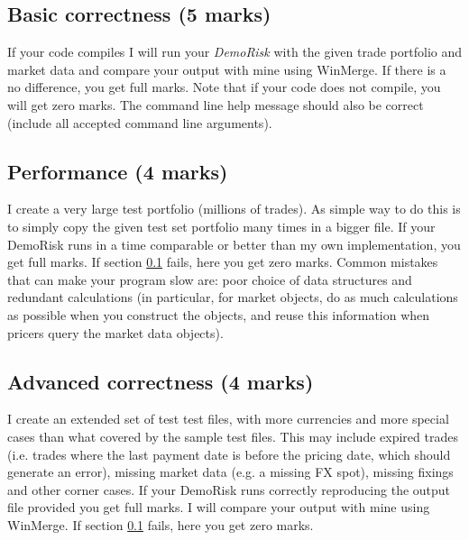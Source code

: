 \documentclass[10pt]{article}
\begin{document}
\subsection{Basic correctness (5 marks)}
\label{sec:correct}
If your code compiles I will run your \textit{DemoRisk} with the given trade portfolio and market data and compare your output with mine using WinMerge. If there is a no difference, you get full marks. Note that if your code does not compile, you will get zero marks. The command line help message should also be correct (include all accepted command line arguments).

\subsection{Performance (4 marks)}
I create a very large test portfolio (millions of trades). As simple way to do this is to simply copy the given test set portfolio many times in a bigger file. If your DemoRisk runs in a time comparable or better than my own implementation, you get full marks. If section \ref{sec:correct} fails, here you get zero marks. Common mistakes that can make your program slow are: poor choice of data structures and redundant calculations (in particular, for market objects, do as much calculations as possible when you construct the objects, and reuse this information when pricers query the market data objects).

\subsection{Advanced correctness (4 marks)}
I create an extended set of test test files, with more currencies and more special cases than what covered by the sample test files. This may include expired trades (i.e. trades where the last payment date is before the pricing date, which should generate an error), missing market data (e.g. a missing FX spot), missing fixings and other corner cases. If your DemoRisk runs correctly reproducing the output file provided you get full marks. I will compare your output with mine using WinMerge. If section \ref{sec:correct} fails, here you get zero marks.
\end{document}
